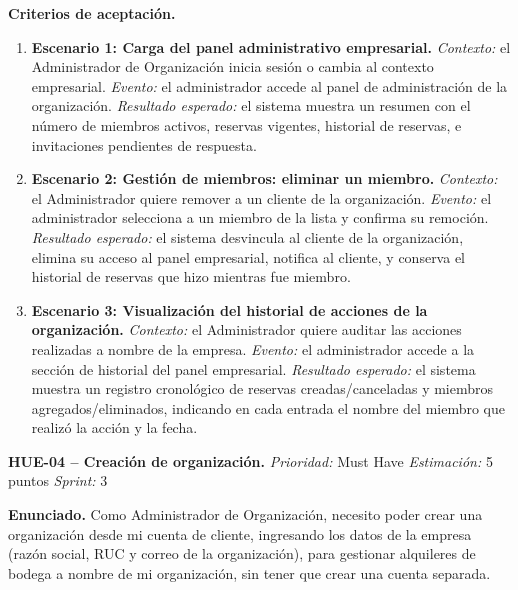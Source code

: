 \textbf{Criterios de aceptación.}
\begin{enumerate}
\item \textbf{Escenario 1: Carga del panel administrativo empresarial.} \textit{Contexto:} el Administrador de Organización inicia sesión o cambia al contexto empresarial. \textit{Evento:} el administrador accede al panel de administración de la organización. \textit{Resultado esperado:} el sistema muestra un resumen con el número de miembros activos, reservas vigentes, historial de reservas, e invitaciones pendientes de respuesta.
\item \textbf{Escenario 2: Gestión de miembros: eliminar un miembro.} \textit{Contexto:} el Administrador quiere remover a un cliente de la organización. \textit{Evento:} el administrador selecciona a un miembro de la lista y confirma su remoción. \textit{Resultado esperado:} el sistema desvincula al cliente de la organización, elimina su acceso al panel empresarial, notifica al cliente, y conserva el historial de reservas que hizo mientras fue miembro.
\item \textbf{Escenario 3: Visualización del historial de acciones de la organización.} \textit{Contexto:} el Administrador quiere auditar las acciones realizadas a nombre de la empresa. \textit{Evento:} el administrador accede a la sección de historial del panel empresarial. \textit{Resultado esperado:} el sistema muestra un registro cronológico de reservas creadas/canceladas y miembros agregados/eliminados, indicando en cada entrada el nombre del miembro que realizó la acción y la fecha.
\end{enumerate}

\textbf{HUE-04 -- Creación de organización.} \label{req:HUE-04}
\textit{Prioridad:} Must Have \quad \textit{Estimación:} 5 puntos \quad \textit{Sprint:} 3

\textbf{Enunciado.} Como Administrador de Organización, necesito poder crear una organización desde mi cuenta de cliente, ingresando los datos de la empresa (razón social, RUC y correo de la organización), para gestionar alquileres de bodega a nombre de mi organización, sin tener que crear una cuenta separada.

